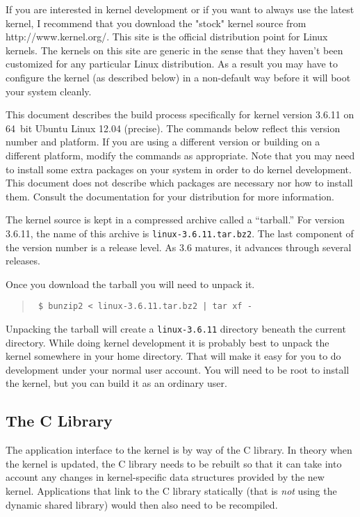 \documentclass{article}
\newcommand{\filename}[1]{\texttt{#1}}   %
\newenvironment{commands}
  {\begin{quote} \tt}
  {\end{quote}}
\begin{document}
If you are interested in kernel development or if you want to always use the latest kernel, I
recommend that you download the "stock" kernel source from http://www.kernel.org/. This site is
the official distribution point for Linux kernels. The kernels on this site are generic in the
sense that they haven't been customized for any particular Linux distribution. As a result you
may have to configure the kernel (as described below) in a non-default way before it will boot
your system cleanly.

This document describes the build process specifically for kernel version 3.6.11 on 64~bit
Ubuntu Linux 12.04 (precise). The commands below reflect this version number and platform. If
you are using a different version or building on a different platform, modify the commands as
appropriate. Note that you may need to install some extra packages on your system in order to do
kernel development. This document does not describe which packages are necessary nor how to
install them. Consult the documentation for your distribution for more information.

The kernel source is kept in a compressed archive called a ``tarball.'' For version 3.6.11, the
name of this archive is \filename{linux-3.6.11.tar.bz2}. The last component of the version
number is a release level. As 3.6 matures, it advances through several releases.

Once you download the tarball you will need to unpack it.

\begin{commands}
\$ bunzip2 < linux-3.6.11.tar.bz2 | tar xf -
\end{commands}

Unpacking the tarball will create a \filename{linux-3.6.11} directory beneath the current
directory. While doing kernel development it is probably best to unpack the kernel somewhere in
your home directory. That will make it easy for you to do development under your normal user
account. You will need to be root to install the kernel, but you can build it as an ordinary
user.

\subsection{The C Library }

The application interface to the kernel is by way of the C library. In theory when the kernel is
updated, the C library needs to be rebuilt so that it can take into account any changes in
kernel-specific data structures provided by the new kernel. Applications that link to the C
library statically (that is \emph{not} using the dynamic shared library) would then also need to
be recompiled.
\end{document}
